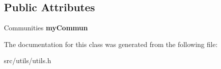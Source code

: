 \subsection*{Public Attributes}
\begin{DoxyCompactItemize}
\item 
\hypertarget{classall__distance__sketch_1_1utils_1_1Community_aa9ca661c9b1db2b0322b5f2983184bb1}{}Communities {\bfseries my\+Commun}\label{classall__distance__sketch_1_1utils_1_1Community_aa9ca661c9b1db2b0322b5f2983184bb1}

\end{DoxyCompactItemize}


The documentation for this class was generated from the following file\+:\begin{DoxyCompactItemize}
\item 
src/utils/utils.\+h\end{DoxyCompactItemize}
